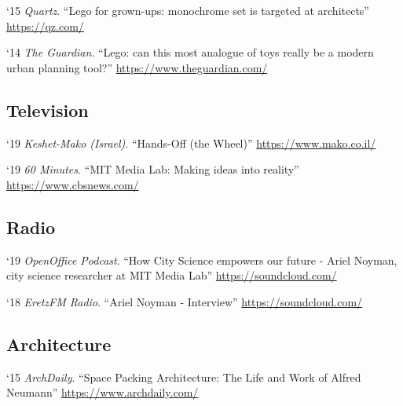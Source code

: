 \begin{tablist}
    \item[`15] \tab \textit{Quartz}. \enquote{Lego for grown-ups: monochrome set is targeted at architects}
    \href{https://qz.com/315776/lego-for-grown-ups-the-toy-maker-is-targeting-architects-and-urban-planners/}{https://qz.com/}

    \item[`14] \tab \textit{The Guardian}. \enquote{Lego: can this most analogue of toys really be a modern urban planning tool?}
    \href{https://www.theguardian.com/cities/2014/dec/18/lego-toys-urban-planning-tool-architects-mit}{https://www.theguardian.com/}

    \subsection*{Television}
    \item[`19] \tab \textit{Keshet-Mako (Israel)}. \enquote{Hands-Off (the Wheel)}
    \href{https://www.mako.co.il/nexter-weekend/Article-29c0ce116238d51006.htm}{https://www.mako.co.il/}

    \item[`19] \tab \textit{60 Minutes}. \enquote{MIT Media Lab: Making ideas into reality}
    \href{https://www.cbsnews.com/news/60-minutes-mit-media-lab-making-ideas-into-reality-future-factory-2019-08-04/}{https://www.cbsnews.com/}

    \subsection*{Radio}

    \item[`19] \tab \textit{OpenOffice Podcast}. \enquote{How City Science empowers our future - Ariel Noyman, city science researcher at MIT Media Lab}
    \href{https://soundcloud.com/openofficepodcast/5-how-city-science-empowers-our-future-ariel-noyman-city-science-researcher-at-mit-media-lab}{https://soundcloud.com/}

    \item[`18] \tab \textit{EretzFM Radio}. \enquote{Ariel Noyman - Interview}
    \href{https://soundcloud.com/eretzfm/070119a-3}{https://soundcloud.com/}


    \subsection*{Architecture}
    \item[`15] \tab \textit{ArchDaily}. \enquote{Space Packing Architecture: The Life and Work of Alfred Neumann}
    \href{https://www.archdaily.com/633053/space-packing-architecture-the-life-and-work-of-alfred-neumann}{https://www.archdaily.com/}


\end{tablist}
